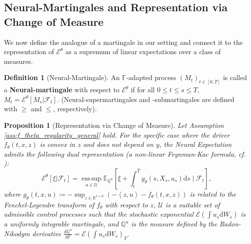 \documentclass[qian]{imsart}
\newcommand{\R}{\mathbb{R}}
\newcommand{\E}{\mathbb{E}}
\newcommand{\Fcal}{\mathcal{F}}
\newcommand{\cEneutheta}{\mathcal{E}^{\theta}}
\newcommand{\dd}{\mathrm{d}}
\newcommand{\scpr}[2]{\left\langle #1, #2 \right\rangle}
\theoremstyle{plain}
\newtheorem{proposition}[theorem]{Proposition}
\theoremstyle{definition}
\newtheorem{definition}[theorem]{Definition}
\begin{document}
\subsection{Neural-Martingales and Representation via Change of Measure}

We now define the analogue of a martingale in our setting and connect it to the representation of $\cEneutheta$ as a supremum of linear expectations over a class of measures.

\begin{definition}[Neural-Martingale]
\label{def:neural_martingale_revised}
An $\mathbb{F}$-adapted process $(M_t)_{t \in [0,T]}$ is called a \textbf{Neural-martingale} with respect to $\cEneutheta$ if for all $0 \le t \le s \le T$, $M_t = \cEneutheta[M_s | \Fcal_t]$. (Neural-supermartingales and -submartingales are defined with $\ge$ and $\le$, respectively).
\end{definition}

\begin{proposition}[Representation via Change of Measure]
\label{prop:feynman_kac}
Let Assumption \ref{ass:f_theta_regularity_general} hold. For the specific case where the driver $f_\theta(t,x,z)$ is convex in $z$ and does not depend on $y$, the Neural Expectation admits the following dual representation (a non-linear Feynman-Kac formula, cf. \cite{ElKarouiPengQuenez1997}):
\[ \cEneutheta[\xi | \Fcal_t] = \operatorname*{ess\,sup}_{u \in \mathcal{U}} \E_{\mathbb{Q}^u}\left[\xi + \int_t^T g_\theta(s, X_s, u_s) \dd s \mid \Fcal_t\right], \]
where $g_\theta(t,x,u) \coloneqq -\sup_{z \in \R^{1 \times d}} \left( -\scpr{z}{u} - f_\theta(t,x,z) \right)$ is related to the Fenchel-Legendre transform of $f_\theta$ with respect to $z$, $\mathcal{U}$ is a suitable set of admissible control processes such that the stochastic exponential $\mathcal{E}(\int u_s \dd W_s)$ is a uniformly integrable martingale, and $\mathbb{Q}^u$ is the measure defined by the Radon-Nikodym derivative $\frac{\dd\mathbb{Q}^u}{\dd\mathbb{P}} = \mathcal{E}\left(\int u_s \dd W_s\right)_T$.
\end{proposition}
\end{document}
